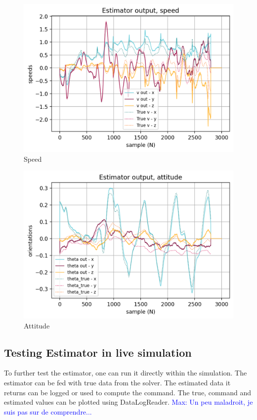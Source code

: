 \documentclass[a4paper,10pt]{article}
\newcommand{\mnaveau}[1]{\textcolor{blue}{Max: #1}}
\begin{document}
\begin{figure}[H]
\centering
  \includegraphics[width=\linewidth, angle=0, scale=0.8]{./images/resultat_simu_speed.png}
  \caption{Speed}
\end{figure}

\begin{figure}[H]
\centering
  \includegraphics[width=\linewidth, angle=0, scale=0.8]{./images/resultat_simu_attitude.png}
  \caption{Attitude}
\end{figure}





\subsection{Testing Estimator in live simulation}
To further test the estimator, one can run it directly within the simulation. The estimator can be fed with true data from the solver. The estimated data it returns can be logged or used to compute the command. The true, command and estimated values can be plotted using DataLogReader.
\mnaveau{Un peu maladroit, je suis pas sur de comprendre...}
\end{document}
